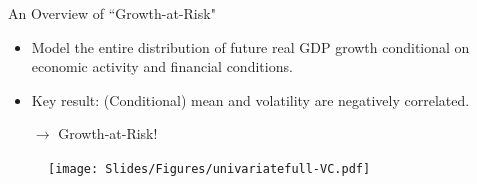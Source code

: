 \documentclass[xcolor=dvipsnames, xcolor=table, 10pt]{beamer}
\newcommand{\rr}[1]{{\color{darkred}#1}}
\begin{document}
\begin{frame}{An Overview of ``Growth-at-Risk"}
\vspace*{0.12in}
\begin{itemize}
    \item Model the \rr{entire} distribution of future real GDP growth \rr{conditional on economic activity and financial conditions}.
    \bigskip
    \item Key result: (Conditional) mean and volatility are negatively correlated.\\    
    \begin{center}
        $\longrightarrow$ \rr{Growth-at-Risk}! 
    \end{center}
    
\end{itemize}
\begin{figure}
    \texttt{[image: Slides/Figures/univariatefull-VC.pdf]}
\end{figure}

\end{frame}


\end{document}
